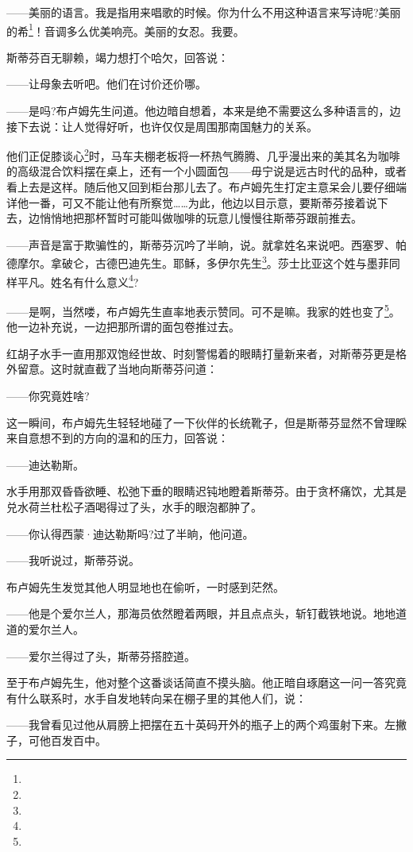 \par ——美丽的语言。我是指用来唱歌的时候。你为什么不用这种语言来写诗呢?美丽的希\footnote{}！音调多么优美响亮。美丽的女忍。我要。
\par 斯蒂芬百无聊赖，竭力想打个哈欠，回答说：
\par ——让母象去听吧。他们在讨价还价哪。
\par ——是吗?布卢姆先生问道。他边暗自想着，本来是绝不需要这么多种语言的，边接下去说：让人觉得好听，也许仅仅是周围那南国魅力的关系。
\par 他们正促膝谈心\footnote{}时，马车夫棚老板将一杯热气腾腾、几乎漫出来的美其名为咖啡的高级混合饮料摆在桌上，还有一个小圆面包——毋宁说是远古时代的品种，或者看上去是这样。随后他又回到柜台那儿去了。布卢姆先生打定主意呆会儿要仔细端详他一番，可又不能让他有所察觉……为此，他边以目示意，要斯蒂芬接着说下去，边悄悄地把那杯暂时可能叫做咖啡的玩意儿慢慢往斯蒂芬跟前推去。
\par ——声音是富于欺骗性的，斯蒂芬沉吟了半晌，说。就拿姓名来说吧。西塞罗、帕德摩尔。拿破仑，古德巴迪先生。耶稣，多伊尔先生\footnote{}。莎士比亚这个姓与墨菲同样平凡。姓名有什么意义\footnote{}?
\par ——是啊，当然喽，布卢姆先生直率地表示赞同。可不是嘛。我家的姓也变了\footnote{}。他一边补充说，一边把那所谓的面包卷推过去。
\par 红胡子水手一直用那双饱经世故、时刻警惕着的眼睛打量新来者，对斯蒂芬更是格外留意。这时就直截了当地向斯蒂芬问道：
\par ——你究竟姓啥?
\par 这一瞬间，布卢姆先生轻轻地碰了一下伙伴的长统靴子，但是斯蒂芬显然不曾理睬来自意想不到的方向的温和的压力，回答说：
\par ——迪达勒斯。
\par 水手用那双昏昏欲睡、松弛下垂的眼睛迟钝地瞪着斯蒂芬。由于贪杯痛饮，尤其是兑水荷兰杜松子酒喝得过了头，水手的眼泡都肿了。
\par ——你认得西蒙·迪达勒斯吗?过了半晌，他问道。
\par ——我听说过，斯蒂芬说。
\par 布卢姆先生发觉其他人明显地也在偷听，一时感到茫然。
\par ——他是个爱尔兰人，那海员依然瞪着两眼，并且点点头，斩钉截铁地说。地地道道的爱尔兰人。
\par ——爱尔兰得过了头，斯蒂芬搭腔道。
\par 至于布卢姆先生，他对整个这番谈话简直不摸头脑。他正暗自琢磨这一问一答究竟有什么联系时，水手自发地转向呆在棚子里的其他人们，说：
\par ——我曾看见过他从肩膀上把摆在五十英码开外的瓶子上的两个鸡蛋射下来。左撇子，可他百发百中。
